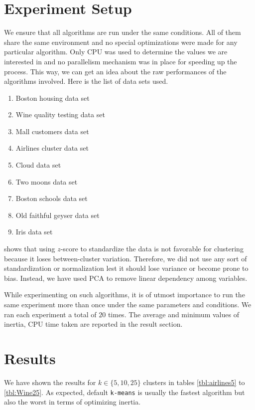 \documentclass[twoside, 11pt]{article}
\begin{document}
	\section{Experiment Setup}
	We ensure that all algorithms are run under the same conditions. All of them share the same environment and no special optimizations were made for any particular algorithm. Only CPU was used to determine the values we are interested in and no parallelism mechanism was in place for speeding up the process. This way, we can get an idea about the raw performances of the algorithms involved. Here is the list of data sets used.
		\begin{enumerate}[i]
			\item Boston housing data set
			\item Wine quality testing data set
			\item Mall customers data set
			\item Airlines cluster data set
			\item Cloud data set
			\item Two moons data set
			\item Boston schools data set
			\item Old faithful geyser data set
			\item Iris data set
		\end{enumerate}
	\cite{miligan} shows that using $z$-score to standardize the data is not favorable for clustering because it loses between-cluster variation. Therefore, we did not use any sort of standardization or normalization lest it should lose variance or become prone to bias. Instead, we have used PCA to remove linear dependency among variables. 
	
	While experimenting on such algorithms, it is of utmost importance to run the same experiment more than once under the same parameters and conditions. We ran each experiment a total of $20$ times. The average and minimum values of inertia, CPU time taken are reported in the result section.
	\section{Results}\label{sec:results}
	We have shown the results for $k\in\{5,10,25\}$ clusters in tables \ref{tbl:airlines5} to \ref{tbl:Wine25}. As expected, default \texttt{k-means} is usually the fastest algorithm but also the worst in terms of optimizing inertia. 
	
\end{document}

